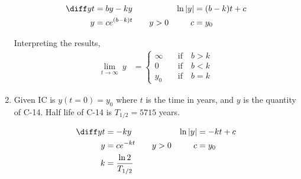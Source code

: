 \begin{enumerate}
          \begin{align}
              \diff yt       & = by - ky                 &
              \ln        |y| & = (b-k)t + c                \\
              y              & = c e^{(b-k)t} \qquad y>0 &
              c              & = y_{0}
          \end{align}
          \begin{figure}[H]
              \centering
          \end{figure}
          Interpreting the results,
          \begin{align}
              \lim_{t \to \infty}\ y & =
              \begin{cases}
                  \infty & \quad \mathrm{if} \quad b>k \\
                  0      & \quad \mathrm{if} \quad b<k \\
                  y_{0}  & \quad \mathrm{if} \quad b=k
              \end{cases}
          \end{align}


    \item Given IC is $y(t = 0) = y_{0}$ where $ t $ is the time in years, and $ y $
          is the quantity of C-14.
          Half life of C-14 is $ T_{1/2} = 5715 $ years.

          \begin{align}
              \diff yt       & = - ky                  &
              \ln        |y| & = -kt + c                 \\
              y              & = c e^{-kt} \qquad y>0  &
              c              & = y_{0}                   \\
              k              & = \frac{\ln 2}{T_{1/2}}
          \end{align}


\end{enumerate}
